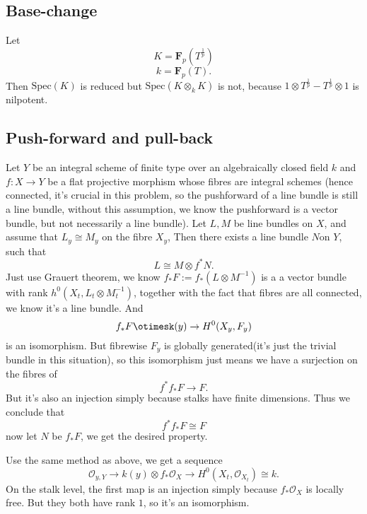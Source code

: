 \documentclass[../main.tex]{subfiles}
\begin{document}
\subsection{Base-change}
\begin{example}
Let $$K=\mathbf{F}_{p}(T^{\frac{1}{p}})$$
$$k=\mathbf{F}_{p}(T).$$
Then $\mathrm{Spec}(K)$ is reduced but $\mathrm{Spec}(K\otimes_{k}K)$ is not, because $1\otimes T^{\frac{1}{p}}-T^{\frac{1}{p}}\otimes 1$ is nilpotent.
\end{example}

\subsection{Push-forward and pull-back}

\begin{example}
Let $Y$ be an integral scheme of finite type over an algebraically closed field $k$ and $f:X\rightarrow Y$ be a flat projective morphism whose fibres are integral schemes (hence connected, it's crucial in this problem, so the pushforward of a line bundle is still a line bundle, without this assumption, we know the pushforward is a vector bundle, but not necessarily a line bundle). Let $L,M$ be line bundles on $X$, and assume that $L_{y}\cong M_{y}$ on the fibre $X_{y}$, Then there exists a line bundle $N $on $Y$, such that 
$$L\cong M\otimes f^{*}N.$$
Just use Grauert theorem, we know $f_{*}F:=f_{*}(L\otimes M^{-1})$ is a a vector bundle with rank $h^{0}(X_{t},L_{t}\otimes M^{-1}_{t})$, together with the fact that fibres are all connected, we know it's a line bundle. And 
$$f_{*}F\otimesk(y)\rightarrow H^{0}(X_{y},F_{y})$$
is an isomorphism. But fibrewise $F_{y}$ is globally generated(it's just the trivial bundle in this situation), so this isomorphism just means we have a surjection on the fibres of
$$f^{*}f_{*}F\rightarrow F.$$
But it's also an injection simply because stalks have finite dimensions. Thus we conclude that 
$$f^{*}f_{*}F\cong F$$
now let $N$ be $f_{*}F$, we get the desired property. 
\end{example}
\begin{remark}
Use the same method as above, we get a sequence 
$$\mathcal{O}_{y,Y}\rightarrow k(y)\otimes f_{*}\mathcal{O}_{X}\rightarrow H^{0}(X_{t}, \mathcal{O}_{X_{t}})\cong k.$$
On the stalk level, the first map is an injection simply because $f_{*}\mathcal{O}_{X}$ is locally free. But they both have rank $1$, so it's an isomorphism. 
\end{remark}
\end{document}
